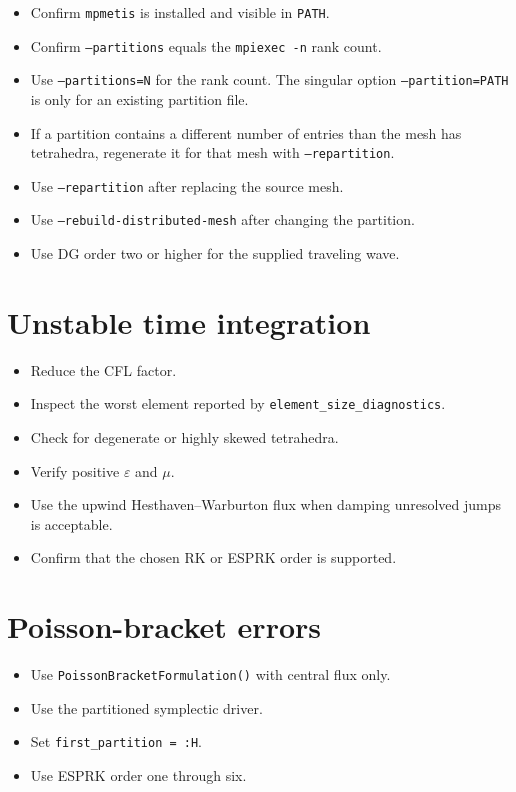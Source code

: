 \documentclass[11pt,oneside]{book}
\newcommand{\code}[1]{\texttt{#1}}
\begin{document}
\begin{itemize}[leftmargin=*]
  \item Confirm \code{mpmetis} is installed and visible in \code{PATH}.
  \item Confirm \code{--partitions} equals the \code{mpiexec -n} rank count.
  \item Use \code{--partitions=N} for the rank count. The singular option
        \code{--partition=PATH} is only for an existing partition file.
  \item If a partition contains a different number of entries than the mesh
        has tetrahedra, regenerate it for that mesh with
        \code{--repartition}.
  \item Use \code{--repartition} after replacing the source mesh.
  \item Use \code{--rebuild-distributed-mesh} after changing the partition.
  \item Use DG order two or higher for the supplied traveling wave.
\end{itemize}

\section{Unstable time integration}

\begin{itemize}[leftmargin=*]
  \item Reduce the CFL factor.
  \item Inspect the worst element reported by
        \code{element\_size\_diagnostics}.
  \item Check for degenerate or highly skewed tetrahedra.
  \item Verify positive $\varepsilon$ and $\mu$.
  \item Use the upwind Hesthaven--Warburton flux when damping unresolved jumps
        is acceptable.
  \item Confirm that the chosen RK or ESPRK order is supported.
\end{itemize}

\section{Poisson-bracket errors}

\begin{itemize}[leftmargin=*]
  \item Use \code{PoissonBracketFormulation()} with central flux only.
  \item Use the partitioned symplectic driver.
  \item Set \code{first\_partition = :H}.
  \item Use ESPRK order one through six.
\end{itemize}
\end{document}
